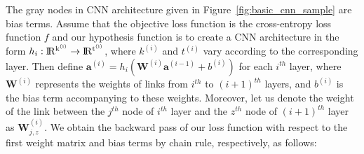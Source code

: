 The gray nodes in CNN architecture given in Figure~\ref{fig:basic_cnn_sample} are bias terms. Assume that the objective loss function is the cross-entropy loss function $f$ and our hypothesis function is to create a CNN architecture in the form $h_{i}: \rm I\!R^{k^{(i)}} \rightarrow \rm I\!R^{t^{(i)}}$, where $k^{(i)}$ and $t^{(i)}$ vary according to the corresponding layer. Then define $\textbf{a}^{(i)} = h_{i}(\textbf{W}^{(i)} \textbf{a}^{(i-1)} + b^{(i)})$ for each $i^{th}$ layer, where $\textbf{W}^{(i)}$ represents the weights of links from $i^{th}$ to $(i+1)^{th}$ layers, and $b^{(i)}$ is the bias term accompanying to these weights. Moreover, let us denote the weight of the link between the $j^{th}$ node of $i^{th}$ layer and the $z^{th}$ node of $(i+1)^{th}$ layer as $\textbf{W}_{j,z}^{(i)}$. We obtain the backward pass of our loss function with respect to the first weight matrix and bias terms by chain rule, respectively, as follows:


